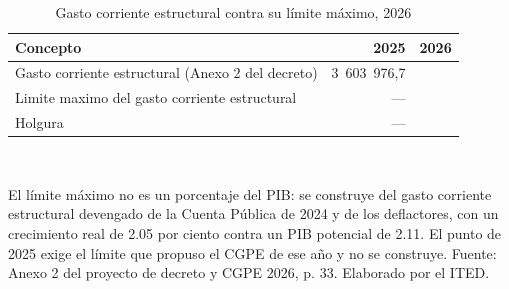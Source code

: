 \begin{table}[htbp]
\centering
\scriptsize
\caption{Gasto corriente estructural contra su límite máximo, 2026}
\label{cua:C4_5}
\begin{tabular}{p{7.4cm}rr}
\toprule
\textbf{Concepto} & \textbf{2025} & \textbf{2026} \\
\midrule
Gasto corriente estructural (Anexo 2 del decreto) & 3 603 976,7 \\
Limite maximo del gasto corriente estructural & --- \\
Holgura & --- \\
\bottomrule
\end{tabular}
\\[2pt]\begin{minipage}{0.92\textwidth}\scriptsize El límite máximo no es un porcentaje del PIB: se construye del gasto corriente estructural devengado de la Cuenta Pública de 2024 y de los deflactores, con un crecimiento real de 2.05 por ciento contra un PIB potencial de 2.11. El punto de 2025 exige el límite que propuso el CGPE de ese año y no se construye. Fuente: Anexo 2 del proyecto de decreto y CGPE 2026, p. 33. Elaborado por el ITED.\end{minipage}
\end{table}
